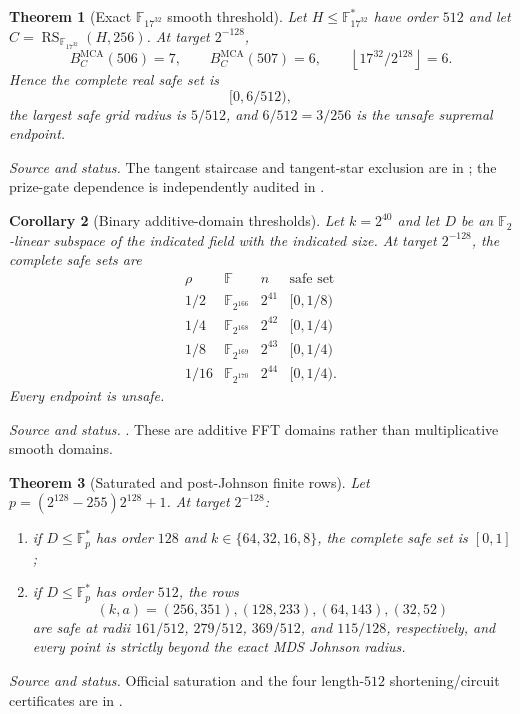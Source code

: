 \documentclass[11pt,a4paper]{amsart}
\numberwithin{equation}{section}
\newtheorem{theorem}{Theorem}[section]
\newtheorem{corollary}[theorem]{Corollary}
\theoremstyle{remark}
\DeclareMathOperator{\RS}{RS}
\DeclareMathOperator{\MCA}{MCA}
\newcommand{\F}{\mathbb F}
\newcommand{\floor}[1]{\left\lfloor#1\right\rfloor}
\newcommand{\source}[1]{\par\smallskip\noindent\textit{Source and status.} #1\par}
\begin{document}
\begin{theorem}[Exact $\mathbb F_{17^{32}}$ smooth threshold]\label{thm:f17}
Let $H\le\mathbb F_{17^{32}}^*$ have order $512$ and let $C=\RS_{\mathbb F_{17^{32}}}(H,256)$.  At target $2^{-128}$,
\[
 B_C^{\MCA}(506)=7,
 \qquad B_C^{\MCA}(507)=6,
 \qquad \floor{17^{32}/2^{128}}=6.
\]
Hence the complete real safe set is
\[
 \boxed{[0,6/512),}
\]
the largest safe grid radius is $5/512$, and $6/512=3/256$ is the unsafe supremal endpoint.
\end{theorem}
\source{The tangent staircase and tangent-star exclusion are in \cite{F17Threshold26}; the prize-gate dependence is independently audited in \cite{F17Audit26}.}

\begin{corollary}[Binary additive-domain thresholds]\label{cor:binary}
Let $k=2^{40}$ and let $D$ be an $\mathbb F_2$-linear subspace of the indicated field with the indicated size.  At target $2^{-128}$, the complete safe sets are
\[
\begin{array}{c|c|c|c}
\rho&\F&n&\text{safe set}\\ \hline
1/2&\F_{2^{166}}&2^{41}&[0,1/8)\\
1/4&\F_{2^{168}}&2^{42}&[0,1/4)\\
1/8&\F_{2^{169}}&2^{43}&[0,1/4)\\
1/16&\F_{2^{170}}&2^{44}&[0,1/4).
\end{array}
\]
Every endpoint is unsafe.
\end{corollary}
\source{\cite[Binary additive-domain rows]{ChoShort26,ChoThresholds26}.  These are additive FFT domains rather than multiplicative smooth domains.}

\begin{theorem}[Saturated and post-Johnson finite rows]\label{thm:saturation-finite}
Let $p=(2^{128}-255)2^{128}+1$.  At target $2^{-128}$:
\begin{enumerate}[label=\textup{(\roman*)},leftmargin=*]
\item if $D\le\F_p^*$ has order $128$ and $k\in\{64,32,16,8\}$, the complete safe set is $[0,1]$;
\item if $D\le\F_p^*$ has order $512$, the rows
\[
 (k,a)=(256,351),(128,233),(64,143),(32,52)
\]
are safe at radii $161/512$, $279/512$, $369/512$, and $115/128$, respectively, and every point is strictly beyond the exact MDS Johnson radius.
\end{enumerate}
\end{theorem}
\source{Official saturation and the four length-$512$ shortening/circuit certificates are in \cite{ChoShort26}.}
\end{document}
